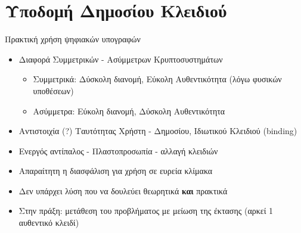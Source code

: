 \documentclass{beamer}
\begin{document}
\section{Υποδομή Δημοσίου Κλειδιού}

\begin{frame}{Πρακτική χρήση ψηφιακών υπογραφών}
     \begin{itemize}
        \item Διαφορά Συμμετρικών - Ασύμμετρων Κρυπτοσυστημάτων
        \begin{itemize}
            \item Συμμετρικά: Δύσκολη διανομή, Εύκολη Αυθεντικότητα (λόγω φυσικών υποθέσεων)
            \item Ασύμμετρα: Εύκολη διανομή, Δύσκολη Αυθεντικότητα
        \end{itemize}
        \item Αντιστοιχία  (?) Ταυτότητας Χρήστη - Δημοσίου, Ιδιωτικού Κλειδιού (binding)
        \pause
        \item Ενεργός αντίπαλος - Πλαστοπροσωπία - αλλαγή κλειδιών
        \pause
        \item Απαραίτητη η διασφάλιση για χρήση σε ευρεία κλίμακα
        \pause
        \item \alert{Δεν υπάρχει λύση} που να δουλεύει θεωρητικά \textbf{και} πρακτικά
        \pause 
        \item Στην πράξη: μετάθεση του προβλήματος με μείωση της έκτασης (αρκεί 1 αυθεντικό κλειδί)
    \end{itemize}
\end{frame}
\end{document}
